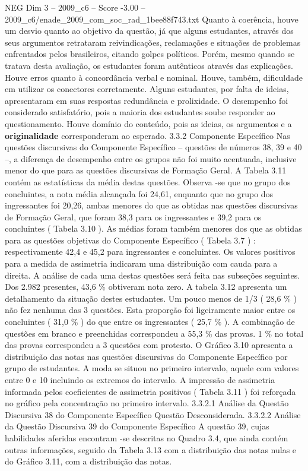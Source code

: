 \begin{textsample}{NEG Dim 3 – 2009\_c6 – Score -3.00 – 2009\_c6/enade\_2009\_com\_soc\_rad\_1bee88f743.txt}
Quanto à coerência, houve um desvio quanto ao objetivo da questão, já que alguns estudantes, através dos seus argumentos retrataram reivindicações, reclamações e situações de problemas enfrentados pelos brasileiros, citando golpes políticos.
Porém, mesmo quando se tratava desta avaliação, os estudantes foram autênticos através das explicações.
Houve erros quanto à concordância verbal e nominal.
Houve, também, dificuldade em utilizar os conectores corretamente.
Alguns estudantes, por falta de ideias, apresentaram em suas respostas redundância e prolixidade.
O desempenho foi considerado satisfatório, pois a maioria dos estudantes soube responder ao questionamento.
Houve domínio do conteúdo, pois as ideias, os argumentos e a \textbf{originalidade} corresponderam ao esperado. 3.3.2 Componente Específico Nas questões discursivas do Componente Específico – questões de números 38, 39 e 40 –, a diferença de desempenho entre os grupos não foi muito acentuada, inclusive menor do que para as questões discursivas de Formação Geral.
A Tabela 3.11 contém as estatísticas da média destas questões.
Observa -se que no grupo dos concluintes, a nota média alcançada foi 24,61, enquanto que no grupo dos ingressantes foi 20,26, ambas menores do que as obtidas nas questões discursivas de Formação Geral, que foram 38,3 para os ingressantes e 39,2 para os concluintes ( Tabela 3.10 ).
As médias foram também menores dos que as obtidas para as questões objetivas do Componente Específico ( Tabela 3.7 ) : respectivamente 42,4 e 45,2 para ingressantes e concluintes.
Os valores positivos para a medida de assimetria indicaram uma distribuição com cauda para a direita.
A análise de cada uma destas questões será feita nas subseções seguintes.
Dos 2.982 presentes, 43,6 \% obtiveram nota zero.
A tabela 3.12 apresenta um detalhamento da situação destes estudantes.
Um pouco menos de 1/3 ( 28,6 \% ) não fez nenhuma das 3 questões.
Esta proporção foi ligeiramente maior entre os concluintes ( 31,0 \% ) do que entre os ingressantes ( 25,7 \% ).
A combinação de questões em branco e preenchidas correspondeu a 55,3 \% das provas. 1 \% no total das provas correspondeu a 3 questões com protesto.
O Gráfico 3.10 apresenta a distribuição das notas nas questões discursivas do Componente Específico por grupo de estudantes.
A moda se situou no primeiro intervalo, aquele com valores entre 0 e 10 incluindo os extremos do intervalo.
A impressão de assimetria informada pelos coeficientes de assimetria positivos ( Tabela 3.11 ) foi reforçada no gráfico pela concentração no primeiro intervalo. 3.3.2.1 Análise da Questão Discursiva 38 do Componente Específico Questão Desconsiderada. 3.3.2.2 Análise da Questão Discursiva 39 do Componente Específico A questão 39, cujas habilidades aferidas encontram -se descritas no Quadro 3.4, que ainda contém outras informações, seguido da Tabela 3.13 com a distribuição das notas nulas e do Gráfico 3.11, com a distribuição das notas.

\end{textsample}
